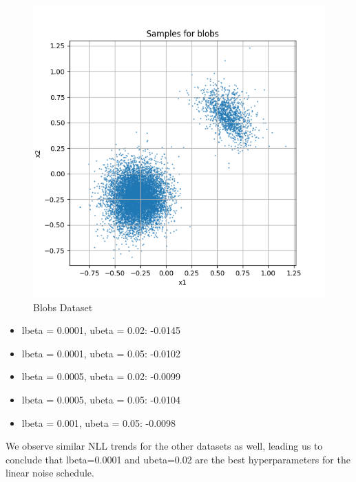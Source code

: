 \documentclass[a4paper,12pt]{article}
\begin{document}
\begin{figure}[H]
\begin{minipage}{0.3\textwidth}
  \end{minipage}
  \begin{minipage}{0.3\textwidth}
      \centering
      \includegraphics[width=\linewidth]{"images/Samples for ddpm_2_200_0.001_0.05_blobs_linear.png"}
  \end{minipage}

  \caption{Blobs Dataset}
\end{figure}

\begin{itemize}
  \item lbeta = 0.0001, ubeta = 0.02: -0.0145
  \item lbeta = 0.0001, ubeta = 0.05: -0.0102
  \item lbeta = 0.0005, ubeta = 0.02: -0.0099
  \item lbeta = 0.0005, ubeta = 0.05: -0.0104
  \item lbeta = 0.001, ubeta = 0.05: -0.0098
\end{itemize}
We observe similar NLL trends for the other datasets as well, leading us to conclude that lbeta=0.0001 and ubeta=0.02 are the best hyperparameters for the linear noise schedule.
\end{document}
